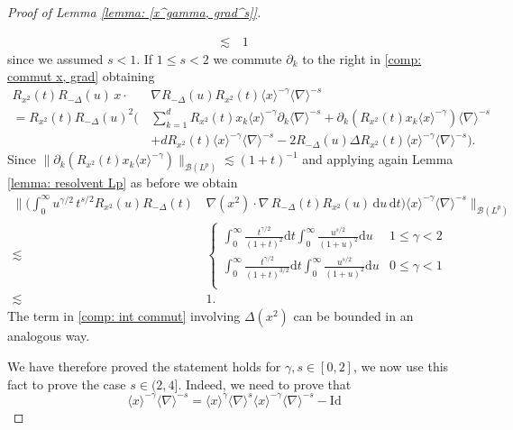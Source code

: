 \documentclass[10pt,a4paper]{amsart}
\begin{document}
\begin{proof}[Proof of Lemma \ref{lemma: [x^gamma, grad^s]}]
\begin{itemize}
\begin{align}
        \lesssim &\, 1  \label{comp: bound [x^g, grad^s]}
    \end{align}
    since we assumed $s<1$. If $1\leq s <2$ we commute $\partial_k$ to the right in \eqref{comp: commut x, grad} obtaining 
    \begin{align*}
       R_{x^2}(t)R_{-\Delta} (u) \, x\cdot &\nabla R_{-\Delta} (u)R_{x^2}(t) \langle x \rangle^{-\gamma} \langle \nabla \rangle^{-s}\\
        =  R_{x^2}(t) R_{-\Delta} (u)^2 \big( \,& \sum_{k=1}^d R_{x^2}(t) x_k \langle x \rangle^{-\gamma} \partial_k \langle \nabla \rangle^{-s}  +  \partial_k (R_{x^2}(t) x_k \langle x \rangle^{-\gamma} )  \langle \nabla \rangle^{-s}\\
         & + d R_{x^2}(t) \langle x \rangle^{-\gamma} \langle \nabla \rangle^{-s} -2R_{-\Delta} (u) \Delta R_{x^2}(t)  \langle x \rangle^{-\gamma} \langle \nabla \rangle^{-s}\big). 
  \end{align*}
    Since $ \|\partial_k (R_{x^2}(t) x_k \langle x \rangle^{-\gamma} ) \|_{\mathcal{B}(L^p)}\lesssim (1+t)^{-1}$ and applying again Lemma \ref{lemma: resolvent Lp} as before we obtain 
    \begin{align*}
      \Big\| \Big (\int_0^\infty u^{\gamma/2}\,t^{s/2} R_{x^2}(u)R_{-\Delta} (t) \, &\nabla(x^2)\cdot \nabla\,R_{-\Delta} (t)R_{x^2} (u)\, \mathrm{d}u\, \mathrm{d}t\Big ) \langle x \rangle^{-\gamma} \langle \nabla \rangle^{-s}\Big\|_{\mathcal{B}(L^p)}\\
      \lesssim  & \begin{cases}
            \int_0^\infty \frac{t^{\gamma/2}}{(1+t)^2} \mathrm{d}t  \int_0^\infty \frac{u^{s/2}}{(1+u)^{2}}  \mathrm{d}u & 1\leq \gamma <2\\
            \int _0^\infty \frac{t^{\gamma/2}}{(1+t)^{3/2}} \mathrm{d}t  \int_0^\infty \frac{u^{s/2}}{(1+u)^{2}}  \mathrm{d}u & 0\leq \gamma <1\\
        \end{cases}\\
        \lesssim & 1 .
    \end{align*}
    The term in \eqref{comp: int commut} involving $\Delta (x^2)$ can be bounded in an analogous way.
    \end{itemize}
     We have therefore proved the statement holds for $\gamma, s \in [0, 2]$, we now use this fact to prove the case $s \in (2, 4]$. Indeed, we need to prove that 
     \begin{equation*}
         [\langle x \rangle^\gamma , \langle \nabla \rangle^s]\langle x \rangle^{-\gamma} \langle \nabla \rangle^{-s} = \langle x \rangle^\gamma \langle \nabla \rangle^s \langle x \rangle^{-\gamma }\langle \nabla \rangle^{-s} - \mathrm{Id}

\end{equation*}
\end{proof}
\end{document}
